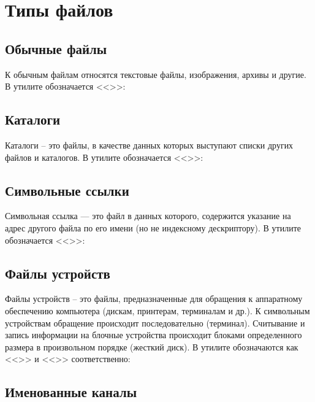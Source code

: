 \newpage

\section{Типы файлов}

\subsection{Обычные файлы}

К обычным файлам относятся текстовые файлы, изображения, архивы и другие. В утилите  обозначается <<\code{-}>>:


\subsection{Каталоги}

Каталоги -- это файлы, в качестве данных которых выступают списки других файлов и каталогов. В утилите  обозначается <<>>:


\subsection{Символьные ссылки}

Символьная ссылка — это файл в данных которого, содержится указание на адрес другого файла по его имени (но не индексному дескриптору). В утилите  обозначается <<>>:


\subsection{Файлы устройств}

Файлы устройств -- это файлы, предназначенные для обращения к аппаратному обеспечению компьютера (дискам, принтерам, терминалам и др.). К символьным устройствам обращение происходит последовательно (терминал).
Считывание и запись информации на блочные устройства происходит блоками определенного размера в произвольном порядке (жесткий диск). В утилите  обозначаются как <<>> и <<>> соответственно:



\subsection{Именованные каналы}

